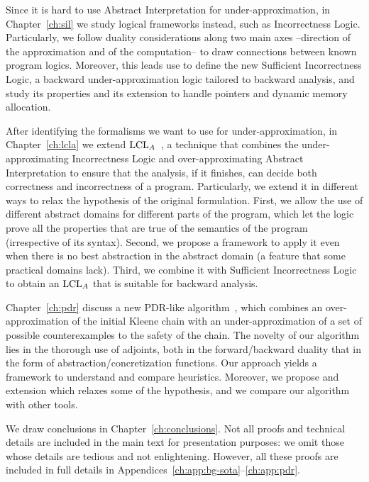 Since it is hard to use Abstract Interpretation for under\hyp{}approximation, in Chapter~\ref{ch:sil} we study logical frameworks instead, such as Incorrectness Logic. Particularly, we follow duality considerations along two main axes --direction of the approximation and of the computation-- to draw connections between known program logics. Moreover, this leads use to define the new Sufficient Incorrectness Logic, a backward under-approximation logic tailored to backward analysis, and study its properties and its extension to handle pointers and dynamic memory allocation.

After identifying the formalisms we want to use for under-approximation, in Chapter~\ref{ch:lcla} we extend $\text{LCL}_A$~\cite{BGGR23}, a technique that combines the under-approximating Incorrectness Logic and over-approximating Abstract Interpretation to ensure that the analysis, if it finishes, can decide both correctness and incorrectness of a program. Particularly, we extend it in different ways to relax the hypothesis of the original formulation. First, we allow the use of different abstract domains for different parts of the program, which let the logic prove all the properties that are true of the semantics of the program (irrespective of its syntax). Second, we propose a framework to apply it even when there is no best abstraction in the abstract domain (a feature that some practical domains lack). Third, we combine it with Sufficient Incorrectness Logic to obtain an $\text{LCL}_A$ that is suitable for backward analysis.

Chapter~\ref{ch:pdr} discuss a new PDR-like algorithm~\cite{Bradley11}, which combines an over\hyp{}approximation of the initial Kleene chain with an under-approximation of a set of possible counterexamples to the safety of the chain. The novelty of our algorithm lies in the thorough use of adjoints, both in the forward/backward duality that in the form of abstraction/concretization functions. Our approach yields a framework to understand and compare heuristics. Moreover, we propose and extension which relaxes some of the hypothesis, and we compare our algorithm with other tools.

We draw conclusions in Chapter~\ref{ch:conclusions}. Not all proofs and technical details are included in the main text for presentation purposes: we omit those whose details are tedious and not enlightening. However, all these proofs are included in full details in Appendices~\ref{ch:app:bg-sota}--\ref{ch:app:pdr}.
